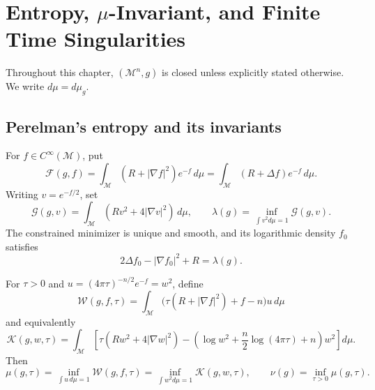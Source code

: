 \chapter{Entropy, \texorpdfstring{$\mu$}{mu}-Invariant, and Finite Time Singularities}
\label{ch:chow-iii-entropy-mu-finite-time-singularities}

Throughout this chapter, $(\mathcal M^n,g)$ is closed unless explicitly
stated otherwise.  We write $d\mu=d\mu_g$.

\section{Perelman's entropy and its invariants}

\begin{definition}
\label{def:chow-iii-ch17-perelman-energy-lambda}
For $f\in C^\infty(\mathcal M)$, put
\[
 \mathcal F(g,f)=\int_{\mathcal M}(R+|\nabla f|^2)e^{-f}\,d\mu
 =\int_{\mathcal M}(R+\Delta f)e^{-f}\,d\mu.
\]
Writing $v=e^{-f/2}$, set
\[
 \mathcal G(g,v)=\int_{\mathcal M}(Rv^2+4|\nabla v|^2)\,d\mu,
 \qquad
 \lambda(g)=\inf_{\int v^2d\mu=1}\mathcal G(g,v).
\]
The constrained minimizer is unique and smooth, and its logarithmic density
$f_0$ satisfies
\[
 2\Delta f_0-|\nabla f_0|^2+R=\lambda(g).
\]
\end{definition}

\begin{definition}
\label{def:chow-iii-ch17-perelman-entropy-mu-nu}
For $\tau>0$ and
$u=(4\pi\tau)^{-n/2}e^{-f}=w^2$, define
\[
 \mathcal W(g,f,\tau)=\int_{\mathcal M}
 \bigl(\tau(R+|\nabla f|^2)+f-n\bigr)u\,d\mu
\]
and equivalently
\[
 \mathcal K(g,w,\tau)=\int_{\mathcal M}
 \left[\tau(Rw^2+4|\nabla w|^2)
 -\left(\log w^2+\frac n2\log(4\pi\tau)+n\right)w^2\right]d\mu.
\]
Then
\[
 \mu(g,\tau)=\inf_{\int u\,d\mu=1}\mathcal W(g,f,\tau)
 =\inf_{\int w^2d\mu=1}\mathcal K(g,w,\tau),
 \qquad \nu(g)=\inf_{\tau>0}\mu(g,\tau).
\]
\end{definition}

